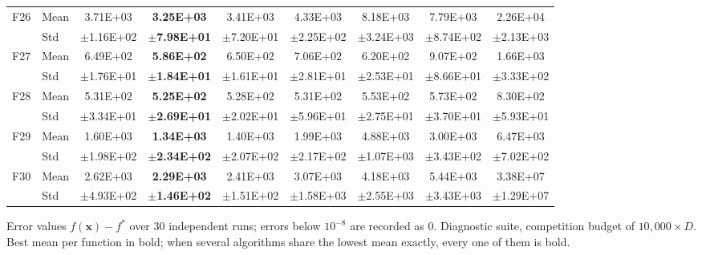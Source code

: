 \begin{table}[htbp]
{\begin{tabular}{clccccccc}
F26 & Mean & 3.71E+03 & \textbf{3.25E+03} & 3.41E+03 & 4.33E+03 & 8.18E+03 & 7.79E+03 & 2.26E+04 \\
 & Std & $\pm$1.16E+02 & $\pm$\textbf{7.98E+01} & $\pm$7.20E+01 & $\pm$2.25E+02 & $\pm$3.24E+03 & $\pm$8.74E+02 & $\pm$2.13E+03 \\
F27 & Mean & 6.49E+02 & \textbf{5.86E+02} & 6.50E+02 & 7.06E+02 & 6.20E+02 & 9.07E+02 & 1.66E+03 \\
 & Std & $\pm$1.76E+01 & $\pm$\textbf{1.84E+01} & $\pm$1.61E+01 & $\pm$2.81E+01 & $\pm$2.53E+01 & $\pm$8.66E+01 & $\pm$3.33E+02 \\
F28 & Mean & 5.31E+02 & \textbf{5.25E+02} & 5.28E+02 & 5.31E+02 & 5.53E+02 & 5.73E+02 & 8.30E+02 \\
 & Std & $\pm$3.34E+01 & $\pm$\textbf{2.69E+01} & $\pm$2.02E+01 & $\pm$5.96E+01 & $\pm$2.75E+01 & $\pm$3.70E+01 & $\pm$5.93E+01 \\
F29 & Mean & 1.60E+03 & \textbf{1.34E+03} & 1.40E+03 & 1.99E+03 & 4.88E+03 & 3.00E+03 & 6.47E+03 \\
 & Std & $\pm$1.98E+02 & $\pm$\textbf{2.34E+02} & $\pm$2.07E+02 & $\pm$2.17E+02 & $\pm$1.07E+03 & $\pm$3.43E+02 & $\pm$7.02E+02 \\
F30 & Mean & 2.62E+03 & \textbf{2.29E+03} & 2.41E+03 & 3.07E+03 & 4.18E+03 & 5.44E+03 & 3.38E+07 \\
 & Std & $\pm$4.93E+02 & $\pm$\textbf{1.46E+02} & $\pm$1.51E+02 & $\pm$1.58E+03 & $\pm$2.55E+03 & $\pm$3.43E+03 & $\pm$1.29E+07 \\
\bottomrule
\end{tabular}}
\begin{flushleft}\footnotesize
Error values $f(\mathbf{x})-f^{*}$ over 30 independent runs; errors below $10^{-8}$ are recorded as 0. Diagnostic suite, competition budget of $10{,}000\times D$. Best mean per function in bold; when several algorithms share the lowest mean exactly, every one of them is bold.
\end{flushleft}
\end{table}
